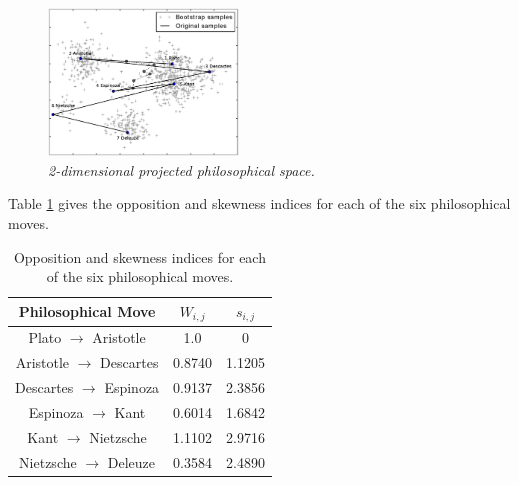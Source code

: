 \documentclass[%
 aip,
 jmp,%
 amsmath,amssymb,
 reprint,%
]{revtex4-1}
\begin{document}
\begin{figure}
        \begin{center}
                \includegraphics[width=0.45\textwidth]{pca_filosofos_novo}
        \end{center}
        \caption{\it 2-dimensional projected philosophical space.}
        \label{fig:pca}
\end{figure}



Table \ref{tab:tableOI} gives the opposition and skewness indices
for each of the six philosophical moves.


\begin{table}%
\caption{\label{tab:tableOI}Opposition and skewness indices for each
of the six philosophical moves.  }

\begin{tabular}{|c||c|c|}
\hline
Philosophical Move & $W_{i,j}$ & $s_{i,j}$ \\
\hline \hline
Plato $\rightarrow$ Aristotle     & 1.0    & 0 \\
Aristotle $\rightarrow$ Descartes & 0.8740 & 1.1205 \\
Descartes $\rightarrow$ Espinoza  & 0.9137 & 2.3856 \\
Espinoza $\rightarrow$ Kant       & 0.6014 & 1.6842 \\
Kant $\rightarrow$ Nietzsche      & 1.1102 & 2.9716 \\
Nietzsche $\rightarrow$ Deleuze   & 0.3584 & 2.4890 \\
\hline
\end{tabular}
\end{table}
\end{document}
